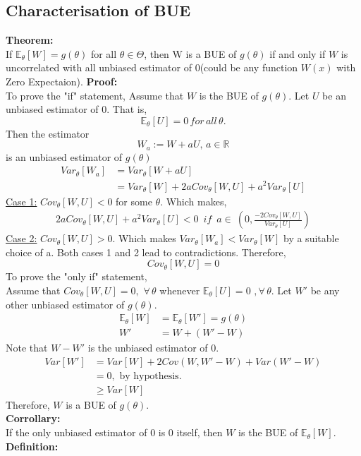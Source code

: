 \documentclass[12pt,a4paper]{article}
\begin{document}
\subsection{Characterisation of BUE}
\textbf{Theorem:} \\
If $\mathbb{E}_\theta[W]=g(\theta)$ for all $\theta\in\Theta$, then W is a BUE of $g(\theta)$ if and only if $W$  is uncorrelated with all unbiased estimator of $0$(could be any function $W(x)$ with Zero Expectaion). 
\textbf{Proof:}\\
To prove the "if" statement,
Assume that $W$ is the BUE of $g(\theta)$.
Let $U$ be an unbiased estimator of 0. That is, $$\mathbb{E}_\theta[U]=0 \,for\, all\, \theta.$$
Then the estimator $$W_a:=W+aU,\,a\in\mathbb{R}$$ is an unbiased estimator of $g(\theta)$
\begin{align}
\nonumber
Var_\theta[W_a]&=Var_\theta[W+aU]\\
&=Var_\theta[W]+2aCov_\theta[W,U]+a^2Var_\theta[U]
\end{align}
\underline{Case 1:} $Cov_\theta[W,U]<0$ for some $\theta$.
Which makes, 
\begin{align}
2aCov_\theta[W,U]+a^2Var_\theta[U]<0 \, \, \,if\, \, \, a\in\ \left(0,\frac{-2Cov_\theta[W,U]}{Var_\theta[U]} \right)
\end{align}
\underline{Case 2:} $Cov_\theta[W,U]>0.$
Which makes $Var_\theta[W_a]<Var_\theta[W]$ by a suitable choice of a.
Both cases 1 and 2 lead to contradictions. Therefore, $$Cov_\theta[W,U]=0$$
To prove the "only if" statement,\\
Assume that $ Cov_\theta[W,U]=0, \,\,\forall \,\theta$ whenever $\mathbb{E}_\theta[U]=0\,\, , \forall \,\theta$.
Let $W'$ be any other unbiased estimator of $g(\theta)$.
\begin{align*}
\mathbb{E}_\theta[W]&=\mathbb{E}_\theta[W']=g(\theta)\\
W'&=W+(W'-W)
\end{align*}
Note that $W-W'$ is the unbiased estimator of 0.
\begin{align*}
Var[W']&=Var[W]+2Cov(W,W'-W)+Var(W'-W)\\
&=0, \,\, \textrm{by hypothesis.}\\
&\geq Var[W]
\end{align*}
Therefore, $W$ is a BUE of $g(\theta)$.\\
\textbf{Corrollary:} \\
If the only unbiased estimator of 0 is 0 itself, then $W$ is the BUE of $\mathbb{E}_\theta[W]$.\\
\textbf{Definition:}\\
\end{document}
